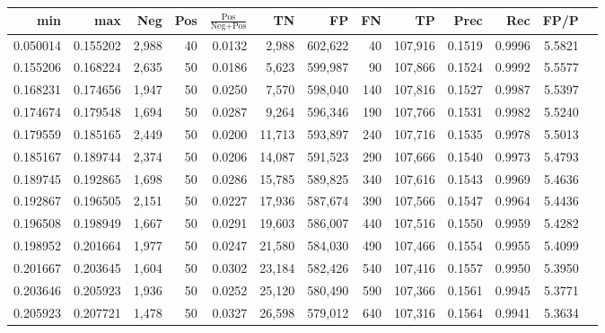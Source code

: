 \begin{tabular}{rrrrrrrrrrrrr}
\toprule
     min &      max &   Neg & Pos & $\frac{\text{Pos}}{\text{Neg}+\text{Pos}}$ &      TN &      FP &      FN &      TP &   Prec &    Rec &   FP/P \\
\midrule
0.050014 & 0.155202 & 2,988 &  40 &                                     0.0132 &   2,988 & 602,622 &      40 & 107,916 & 0.1519 & 0.9996 & 5.5821 \\
0.155206 & 0.168224 & 2,635 &  50 &                                     0.0186 &   5,623 & 599,987 &      90 & 107,866 & 0.1524 & 0.9992 & 5.5577 \\
0.168231 & 0.174656 & 1,947 &  50 &                                     0.0250 &   7,570 & 598,040 &     140 & 107,816 & 0.1527 & 0.9987 & 5.5397 \\
0.174674 & 0.179548 & 1,694 &  50 &                                     0.0287 &   9,264 & 596,346 &     190 & 107,766 & 0.1531 & 0.9982 & 5.5240 \\
0.179559 & 0.185165 & 2,449 &  50 &                                     0.0200 &  11,713 & 593,897 &     240 & 107,716 & 0.1535 & 0.9978 & 5.5013 \\
0.185167 & 0.189744 & 2,374 &  50 &                                     0.0206 &  14,087 & 591,523 &     290 & 107,666 & 0.1540 & 0.9973 & 5.4793 \\
0.189745 & 0.192865 & 1,698 &  50 &                                     0.0286 &  15,785 & 589,825 &     340 & 107,616 & 0.1543 & 0.9969 & 5.4636 \\
0.192867 & 0.196505 & 2,151 &  50 &                                     0.0227 &  17,936 & 587,674 &     390 & 107,566 & 0.1547 & 0.9964 & 5.4436 \\
0.196508 & 0.198949 & 1,667 &  50 &                                     0.0291 &  19,603 & 586,007 &     440 & 107,516 & 0.1550 & 0.9959 & 5.4282 \\
0.198952 & 0.201664 & 1,977 &  50 &                                     0.0247 &  21,580 & 584,030 &     490 & 107,466 & 0.1554 & 0.9955 & 5.4099 \\
0.201667 & 0.203645 & 1,604 &  50 &                                     0.0302 &  23,184 & 582,426 &     540 & 107,416 & 0.1557 & 0.9950 & 5.3950 \\
0.203646 & 0.205923 & 1,936 &  50 &                                     0.0252 &  25,120 & 580,490 &     590 & 107,366 & 0.1561 & 0.9945 & 5.3771 \\
0.205923 & 0.207721 & 1,478 &  50 &                                     0.0327 &  26,598 & 579,012 &     640 & 107,316 & 0.1564 & 0.9941 & 5.3634 \\

\end{tabular}
